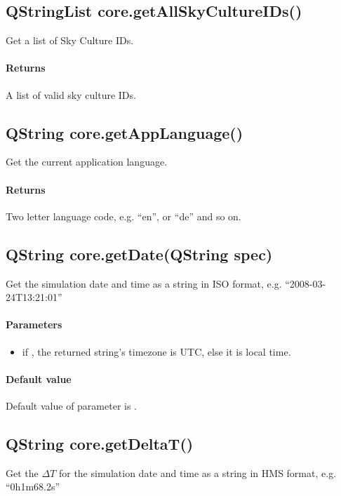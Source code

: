 \subsection{QStringList core.getAllSkyCultureIDs()}
\label{sec:ScriptingAPI:core:getAllSkyCultureIDs}
Get a list of Sky Culture IDs.

\paragraph{Returns}
A list of valid sky culture IDs.

\subsection{QString core.getAppLanguage()}
\label{sec:ScriptingAPI:core:getAppLanguage}
Get the current application language.

\paragraph{Returns}
Two letter language code, e.g. ``en'', or ``de'' and so on.

\subsection{QString core.getDate(QString spec)}
\label{sec:ScriptingAPI:core:getDate}
Get the simulation date and time as a string in ISO format, e.g. ``2008-03-24T13:21:01''

\paragraph{Parameters}
\begin{itemize}
\item {} if , the returned string's timezone is UTC, else it is local time.
\end{itemize}

\paragraph{Default value}
Default value of parameter is .

\subsection{QString core.getDeltaT()}
\label{sec:ScriptingAPI:core:getDeltaT}
Get the $\Delta T$ for the simulation date and time as a string in HMS format, e.g. ``0h1m68.2s''

